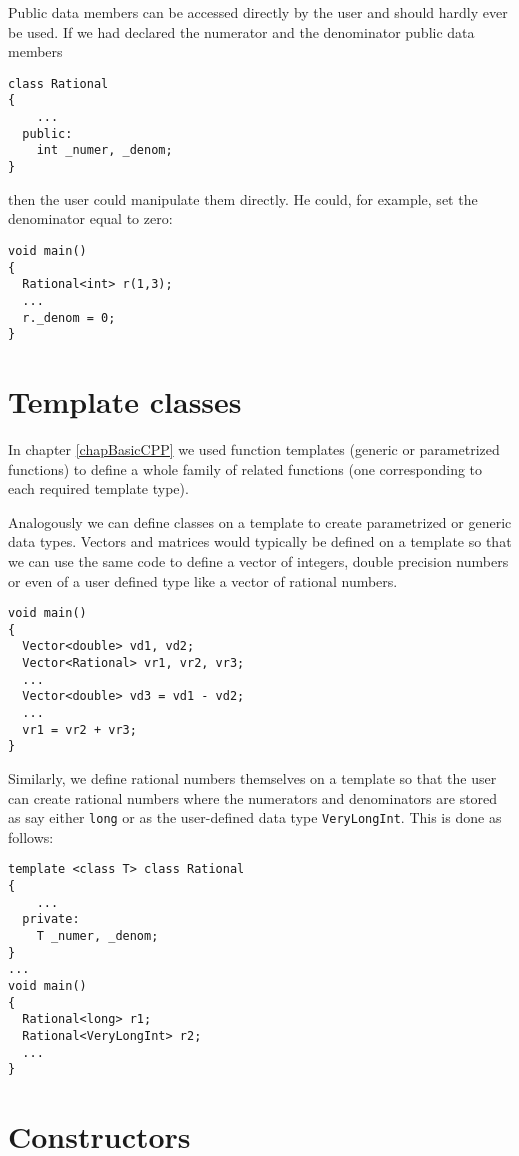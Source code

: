 Public data members can be accessed directly by the user and should hardly
ever be used. If we had declared the numerator and the denominator public
data members
{\footnotesize \begin{verbatim}
class Rational
{
    ...
  public:
    int _numer, _denom;
}
\end{verbatim}}
then the user could manipulate them directly. He could, for example, set the
denominator equal to zero:
{\footnotesize \begin{verbatim}
void main()
{
  Rational<int> r(1,3);
  ...
  r._denom = 0;
}
\end{verbatim}}

\section{Template classes}

In chapter \ref{chapBasicCPP} we used function templates (generic or 
parametrized functions) to define a whole family of related functions 
(one corresponding to each required template type).

Analogously we can define classes on a template to create parametrized 
or generic data types. Vectors and matrices would typically be defined 
on a template so that we can use the same code to define a vector of 
integers, double precision numbers or even of a user defined type like 
a vector of rational numbers. 
{\footnotesize \begin{verbatim}
void main()
{
  Vector<double> vd1, vd2;
  Vector<Rational> vr1, vr2, vr3;
  ...
  Vector<double> vd3 = vd1 - vd2;
  ...
  vr1 = vr2 + vr3; 
}
\end{verbatim}}

Similarly, we define rational numbers themselves on a template so that 
the user can create rational numbers where the numerators and 
denominators are stored as say either \verb+long+ or as the user-defined
data type \verb+VeryLongInt+. This is done as follows:
{\footnotesize \begin{verbatim}
template <class T> class Rational
{
    ...
  private:
    T _numer, _denom;
}
...
void main()
{
  Rational<long> r1;
  Rational<VeryLongInt> r2;
  ...
}
\end{verbatim}}



\section{Constructors \label{secADTTemplatesConstructors}}

